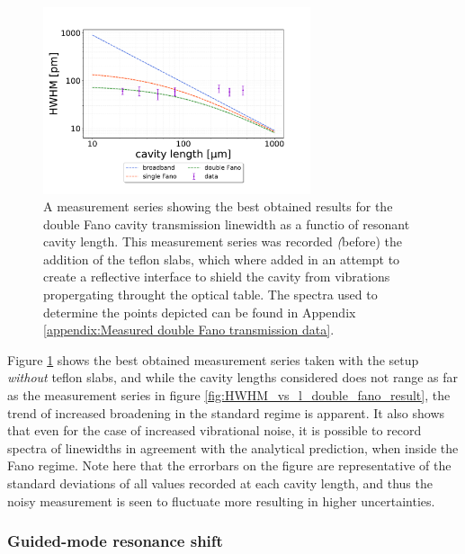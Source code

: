 \begin{figure}[h!]
    \centering
    \includegraphics[width=0.7\textwidth]{figures/results/double fano fits/HWHM_vs_cavity_length_result_2nd_measurement_only.pdf}
    \caption{A measurement series showing the best obtained results for the double Fano cavity transmission linewidth as a functio of resonant cavity length. This measurement series was recorded \emph(before) the addition of the teflon slabs, which where added in an attempt to create a reflective interface to shield the cavity from vibrations propergating throught the optical table. The spectra used to determine the points depicted can be found in Appendix \ref{appendix:Measured double Fano transmission data}.}
    \label{fig:HWHM_vs_l_double_fano_noisy}
\end{figure}

Figure \ref{fig:HWHM_vs_l_double_fano_noisy} shows the best obtained measurement series taken with the setup \emph{without} teflon slabs, and while the cavity lengths considered does not range as far as the measurement series in figure \ref{fig:HWHM_vs_l_double_fano_result}, the trend of increased broadening in the standard regime is apparent. It also shows that even for the case of increased vibrational noise, it is possible to record spectra of linewidths in agreement with the analytical prediction, when inside the Fano regime. Note here that the errorbars on the figure are representative of the standard deviations of all values recorded at each cavity length, and thus the noisy measurement is seen to fluctuate more resulting in higher uncertainties. 

\subsubsection{Guided-mode resonance shift}

